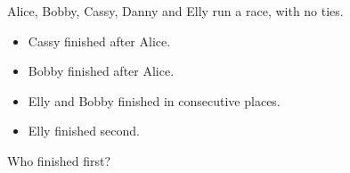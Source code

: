 Alice, Bobby, Cassy, Danny and Elly run a race, with no ties.
\begin{itemize}
\item Cassy finished after Alice.
\item Bobby finished after Alice.
\item Elly and Bobby finished in consecutive places.
\item Elly finished second.
\end{itemize}
Who finished first?
